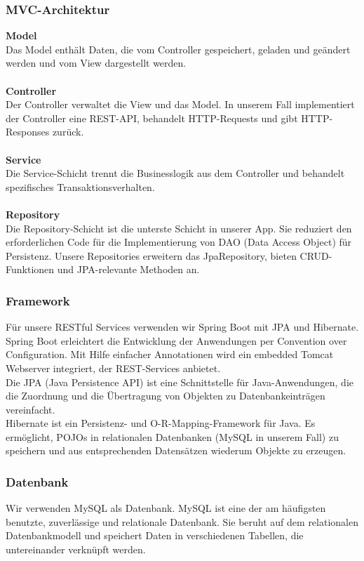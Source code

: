
\subsubsection{MVC-Architektur}

\textbf{Model}\\
Das Model enthält Daten, die vom Controller gespeichert, geladen und geändert werden und vom View dargestellt werden. \\
\\ \textbf{Controller}\\
Der Controller verwaltet die View und das Model. In unserem Fall implementiert der Controller eine REST-API, behandelt HTTP-Requests und gibt HTTP-Responses zurück.\\
\\ \textbf{Service}\\
Die Service-Schicht trennt die Businesslogik aus dem Controller und behandelt spezifisches Transaktionsverhalten.\\
\\ \textbf{Repository}\\ 
Die Repository-Schicht ist die unterste Schicht in unserer App. Sie reduziert den erforderlichen Code für die Implementierung von DAO (Data Access Object) für Persistenz. Unsere Repositories erweitern das JpaRepository, bieten CRUD-Funktionen und JPA-relevante Methoden an.

\subsubsection{Framework}

Für unsere RESTful Services verwenden wir Spring Boot mit JPA und Hibernate. \\
Spring Boot erleichtert die Entwicklung der Anwendungen per Convention over Configuration. Mit Hilfe einfacher Annotationen wird ein embedded Tomcat Webserver integriert, der REST-Services anbietet.\\
Die JPA (Java Persistence API) ist eine Schnittstelle für Java-Anwendungen, die die Zuordnung und die Übertragung von Objekten zu Datenbankeinträgen vereinfacht.\\
Hibernate ist ein Persistenz- und O-R-Mapping-Framework für Java. Es ermöglicht, POJOs in relationalen Datenbanken (MySQL in unserem Fall) zu speichern und aus entsprechenden Datensätzen wiederum Objekte zu erzeugen.

\subsubsection{Datenbank}

Wir verwenden MySQL als Datenbank. MySQL ist eine der am häufigsten benutzte, zuverlässige und relationale Datenbank. Sie beruht auf dem relationalen Datenbankmodell und speichert Daten in verschiedenen Tabellen, die untereinander verknüpft werden. 
